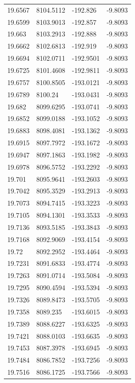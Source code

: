 \begin{table}[H]
\begin{tabular}{llll}
19.6567 & 8104.5112 & -192.826 & -9.8093 \\
19.6599 & 8103.9013 & -192.857 & -9.8093 \\
19.663 & 8103.2913 & -192.888 & -9.8093 \\
19.6662 & 8102.6813 & -192.919 & -9.8093 \\
19.6694 & 8102.0711 & -192.9501 & -9.8093 \\
19.6725 & 8101.4608 & -192.9811 & -9.8093 \\
19.6757 & 8100.8505 & -193.0121 & -9.8093 \\
19.6789 & 8100.24 & -193.0431 & -9.8093 \\
19.682 & 8099.6295 & -193.0741 & -9.8093 \\
19.6852 & 8099.0188 & -193.1052 & -9.8093 \\
19.6883 & 8098.4081 & -193.1362 & -9.8093 \\
19.6915 & 8097.7972 & -193.1672 & -9.8093 \\
19.6947 & 8097.1863 & -193.1982 & -9.8093 \\
19.6978 & 8096.5752 & -193.2292 & -9.8093 \\
19.701 & 8095.9641 & -193.2603 & -9.8093 \\
19.7042 & 8095.3529 & -193.2913 & -9.8093 \\
19.7073 & 8094.7415 & -193.3223 & -9.8093 \\
19.7105 & 8094.1301 & -193.3533 & -9.8093 \\
19.7136 & 8093.5185 & -193.3843 & -9.8093 \\
19.7168 & 8092.9069 & -193.4154 & -9.8093 \\
19.72 & 8092.2952 & -193.4464 & -9.8093 \\
19.7231 & 8091.6833 & -193.4774 & -9.8093 \\
19.7263 & 8091.0714 & -193.5084 & -9.8093 \\
19.7295 & 8090.4594 & -193.5394 & -9.8093 \\
19.7326 & 8089.8473 & -193.5705 & -9.8093 \\
19.7358 & 8089.235 & -193.6015 & -9.8093 \\
19.7389 & 8088.6227 & -193.6325 & -9.8093 \\
19.7421 & 8088.0103 & -193.6635 & -9.8093 \\
19.7453 & 8087.3978 & -193.6945 & -9.8093 \\
19.7484 & 8086.7852 & -193.7256 & -9.8093 \\
19.7516 & 8086.1725 & -193.7566 & -9.8093 \\

\end{tabular}
\end{table}
